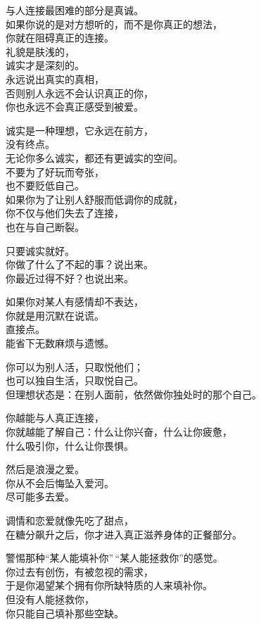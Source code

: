 \documentclass[
]{article}
\begin{document}
与人连接最困难的部分是真诚。\\
如果你说的是对方想听的，而不是你真正的想法，\\
你就在阻碍真正的连接。\\
礼貌是肤浅的，\\
诚实才是深刻的。\\
永远说出真实的真相，\\
否则别人永远不会认识真正的你，\\
你也永远不会真正感受到被爱。

诚实是一种理想，它永远在前方，\\
没有终点。\\
无论你多么诚实，都还有更诚实的空间。\\
不要为了好玩而夸张，\\
也不要贬低自己。\\
如果你为了让别人舒服而低调你的成就，\\
你不仅与他们失去了连接，\\
也在与自己断裂。

只要诚实就好。\\
你做了什么了不起的事？说出来。\\
你最近过得不好？也说出来。

如果你对某人有感情却不表达，\\
你就是用沉默在说谎。\\
直接点。\\
能省下无数麻烦与遗憾。

你可以为别人活，只取悦他们；\\
也可以独自生活，只取悦自己。\\
但理想状态是：在别人面前，依然做你独处时的那个自己。

你越能与人真正连接，\\
你就越能了解自己：什么让你兴奋，什么让你疲惫，\\
什么吸引你，什么让你畏惧。

然后是浪漫之爱。\\
你从不会后悔坠入爱河。\\
尽可能多去爱。

调情和恋爱就像先吃了甜点，\\
在糖分飙升之后，你才进入真正滋养身体的正餐部分。

警惕那种``某人能填补你''\,``某人能拯救你''的感觉。\\
你过去有创伤，有被忽视的需求，\\
于是你渴望某个拥有你所缺特质的人来填补你。\\
但没有人能拯救你，\\
你只能自己填补那些空缺。
\end{document}
